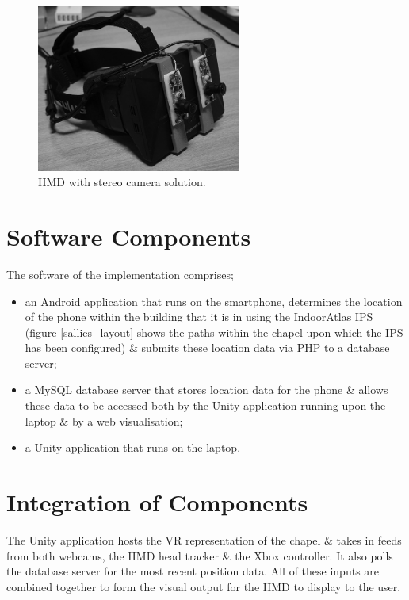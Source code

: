 \documentclass[oneside]{book}
\begin{document}
\begin{figure}[h]
	\begin{center}
		\includegraphics[width=0.6\textwidth]{images/rift.png}
		\caption{HMD with stereo camera solution.}
		\label{rift}
	\end{center}
\end{figure}

\section{Software Components}
The software of the implementation comprises;

\begin{itemize}
	\item an Android application that runs on the smartphone, determines the location of the phone within the building that it is in using the IndoorAtlas IPS~\cite{IndoorAtlasLtd.2012} (figure \ref{sallies_layout} shows the paths within the chapel upon which the IPS has been configured) \& submits these location data via PHP to a database server;
	\item a MySQL database server that stores location data for the phone \& allows these data to be accessed both by the Unity application running upon the laptop \& by a web visualisation;
	\item a Unity application that runs on the laptop.
\end{itemize}

\section{Integration of Components}
The Unity application hosts the VR representation of the chapel \& takes in feeds from both webcams, the HMD head tracker \& the Xbox controller. It also polls the database server for the most recent position data. All of these inputs are combined together to form the visual output for the HMD to display to the user.
\end{document}
